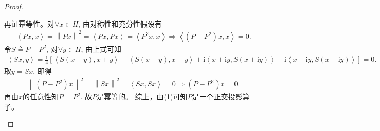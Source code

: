 \documentclass[../../main.tex]{subfiles}%
\begin{document}
\begin{proof}
\begin{enumerate}[(1)]
再证幂等性。对$\forall x\in H$, 由对称性和充分性假设有
\begin{align*}
\left\langle Px,x \right\rangle =\left\| Px \right\| ^2=\left\langle Px,Px \right\rangle =\left\langle P^2x,x \right\rangle \Longrightarrow \left\langle \left( P-P^2 \right) x,x \right\rangle =0.
\end{align*}
令$S\triangleq P-P^2$, 对$\forall y\in H$, 由上式可知
\begin{align*}
\left\langle Sx,y \right\rangle =\frac{1}{4}\left[ \left\langle S\left( x+y \right) ,x+y \right\rangle -\left\langle S\left( x-y \right) ,x-y \right\rangle +\mathrm{i}\left\langle x+\mathrm{i}y,S\left( x+\mathrm{i}y \right) \right\rangle -\mathrm{i}\left\langle x-\mathrm{i}y,S\left( x-\mathrm{i}y \right) \right\rangle \right] =0.
\end{align*}
取$y=Sx$, 即得
\begin{align*}
\left\| \left( P-P^2 \right) x \right\| ^2=\left\| Sx \right\| ^2=\left\langle Sx,Sx \right\rangle =0\Longrightarrow \left( P-P^2 \right) x=0.
\end{align*}
再由$x$的任意性知$P=P^2$. 故$P$是幂等的。
综上，由(1)可知$P$是一个正交投影算子。
\end{enumerate}
\end{proof}
\end{document}
